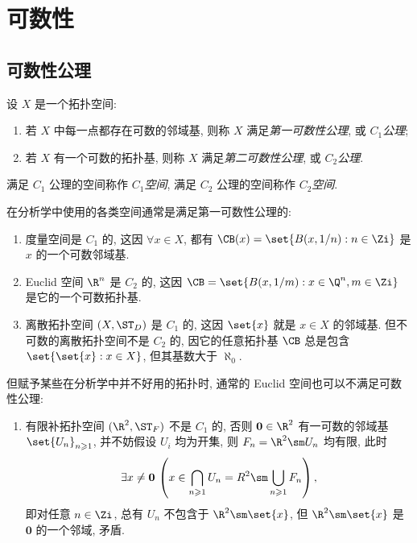 
\section{可数性}

\subsection{可数性公理}

    \begin{Definition}[可数性公理]
        设 $ X $ 是一个拓扑空间:
        \begin{enumerate}
            \item 若 $ X $ 中每一点都存在可数的邻域基, 则称 $ X $ 满足\emph{第一可数性公理}, 或 $ C_1 $\emph{公理};
            \item 若 $ X $ 有一个可数的拓扑基, 则称 $ X $ 满足\emph{第二可数性公理}, 或 $ C_2 $\emph{公理}.
        \end{enumerate}
        满足 $ C_1 $ 公理的空间称作 $ C_1 $\emph{空间}, 满足 $ C_2 $ 公理的空间称作 $ C_2 $\emph{空间}.
    \end{Definition}

    \begin{Example}\label{ex:可数性例子}
        在分析学中使用的各类空间通常是满足第一可数性公理的:
        \begin{enumerate}
            \item 度量空间是 $ C_1 $ 的, 这因 $ \forall x\in X $, 都有 $ \CB(x)=\set{B(x,1/n) : n\in\Zi} $ 是 $ x $ 的一个可数邻域基.
            \item Euclid 空间 $ \R^n $ 是 $ C_2 $ 的, 这因 $ \CB=\set{B(x,1/m) : x\in\Q^n, m\in\Zi} $ 是它的一个可数拓扑基.
            \item 离散拓扑空间 $ (X,\ST_D) $ 是 $ C_1 $ 的, 这因 $ \set{x} $ 就是 $ x\in X $ 的邻域基. 但不可数的离散拓扑空间不是 $ C_2 $ 的, 因它的任意拓扑基 $ \CB $ 总是包含 $ \set{\set{x} : x\in X} $, 但其基数大于 $ \aleph_0 $.
        \end{enumerate}
        但赋予某些在分析学中并不好用的拓扑时, 通常的 Euclid 空间也可以不满足可数性公理:
        \begin{enumerate}[start=4]
            \item 有限补拓扑空间 $ (\R^2,\ST_F) $ 不是 $ C_1 $ 的, 否则 $ \mathbf{0}\in\R^2 $ 有一可数的邻域基 $ \set{U_n}_{n\geqslant 1} $, 并不妨假设 $ U_i $ 均为开集, 则 $ F_n=\R^2\sm U_n $ 均有限, 此时
            \[
                \exists x\ne\mathbf{0}\,\left( x\in\bigcap_{n\geqslant 1}U_n=R^2\sm\bigcup_{n\geqslant 1}F_n \right),
            \]
            即对任意 $ n\in\Zi $, 总有 $ U_n $ 不包含于 $ \R^2\sm\set{x} $, 但 $ \R^2\sm\set{x} $ 是 $ \mathbf{0} $ 的一个邻域, 矛盾.
        \end{enumerate}
    \end{Example}

